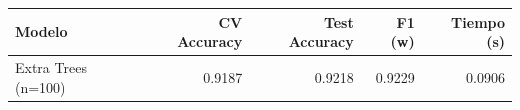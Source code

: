 \begin{tabular}{lrrrr}
\toprule
Modelo & CV Accuracy & Test Accuracy & F1 (w) & Tiempo (s) \\
\midrule
Extra Trees (n=100) & 0.9187 & 0.9218 & 0.9229 & 0.0906 \\
\bottomrule
\end{tabular}
